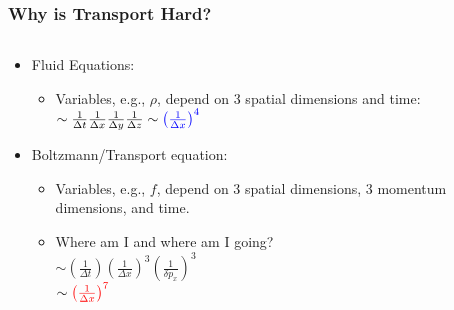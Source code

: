 \documentclass[]{beamer}
\begin{document}
\begin{frame}
  \frametitle{Why is Transport Hard?}
  \begin{columns}
    \begin{column}{8cm}
      \begin{itemize}
      \item Fluid Equations:
        \begin{itemize}
        \item Variables, e.g., $\rho$, depend on 3 spatial dimensions
          and time:\\
          $\sim \frac{1}{\Delta t} \frac{1}{\Delta x}\frac{1}{\Delta y}\frac{1}{\Delta z} \sim {\color{blue}\left(\frac{1}{\Delta x}\right)^4}$
        \end{itemize}
      \item Boltzmann/Transport equation:
        \begin{itemize}
        \item Variables, e.g., $f$, depend on 3 spatial dimensions, 3 momentum dimensions, and time.
        \item Where am I and where am I going?\\
          $\sim \left(\frac{1}{\Delta t}\right)\left(\frac{1}{\Delta x}\right)^3\left(\frac{1}{\delta p_x}\right)^3$\\
          $\sim {\color{red}\left(\frac{1}{\Delta x}\right)^7}$
        \end{itemize}
      \end{itemize}
    \end{column}
    \begin{column}{4cm}
      \begin{center}
      \end{center}
    \end{column}
  \end{columns}
\end{frame}
\end{document}
